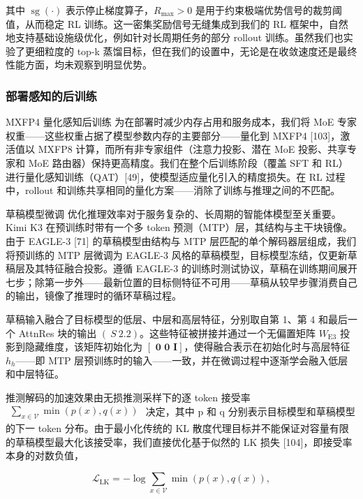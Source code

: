 \documentclass[
  10
]{article}
\begin{document}
其中 \(\operatorname { s g } ( \cdot )\) 表示停止梯度算子，\(R _ { \operatorname* { m a x } } > 0\) 是用于约束极端优势信号的裁剪阈值，从而稳定 RL 训练。这一密集奖励信号无缝集成到我们的 RL 框架中，自然地支持基础设施级优化，例如针对长周期任务的部分 rollout 训练。虽然我们也实验了更细粒度的 top-k 蒸馏目标，但在我们的设置中，无论是在收敛速度还是最终性能方面，均未观察到明显优势。

\subsubsection{部署感知的后训练}\label{deployment-aware-post-training}

MXFP4 量化感知后训练 为在部署时减少内存占用和服务成本，我们将 MoE 专家权重——这些权重占据了模型参数内存的主要部分——量化到 MXFP4 {[}103{]}，激活值以 MXFP8 计算，而所有非专家组件（注意力投影、潜在 MoE 投影、共享专家和 MoE 路由器）保持更高精度。我们在整个后训练阶段（覆盖 SFT 和 RL）进行量化感知训练（QAT）{[}49{]}，使模型适应量化引入的精度损失。在 RL 过程中，rollout 和训练共享相同的量化方案——消除了训练与推理之间的不匹配。

草稿模型微调 优化推理效率对于服务复杂的、长周期的智能体模型至关重要。Kimi K3 在预训练时带有一个多 token 预测（MTP）层，其结构与主干块镜像。由于 EAGLE-3 {[}71{]} 的草稿模型由结构与 MTP 层匹配的单个解码器层组成，我们将预训练的 MTP 层微调为 EAGLE-3 风格的草稿模型，目标模型冻结，仅更新草稿层及其特征融合投影。遵循 EAGLE-3 的训练时测试协议，草稿在训练期间展开七步；除第一步外——最新位置的目标侧特征不可用——草稿从较早步骤消费自己的输出，镜像了推理时的循环草稿过程。

草稿输入融合了目标模型的低层、中层和高层特征，分别取自第 1、第 4 和最后一个 AttnRes 块的输出 \(( \ S ~ 2 . 2 )\)。这些特征被拼接并通过一个无偏置矩阵 \(W _ { \mathrm { E 3 } }\) 投影到隐藏维度，该矩阵初始化为 \(\left[ \textbf { 0 0 } \pmb { I } \right]\)，使得融合表示在初始化时与高层特征 \(h _ { h }\)——即 MTP 层预训练时的输入——一致，并在微调过程中逐渐学会融入低层和中层特征。

推测解码的加速效果由无损推测采样下的逐 token 接受率 \(\begin{array} { r } { \sum _ { x \in \mathcal { V } } \operatorname* { m i n } ( p ( x ) , q ( x ) ) } \end{array}\) 决定，其中 p 和 q 分别表示目标模型和草稿模型的下一 token 分布。由于最小化传统的 KL 散度代理目标并不能保证对容量有限的草稿模型最大化该接受率，我们直接优化基于似然的 LK 损失 {[}104{]}，即接受率本身的对数负值，

\[
\mathcal {L} _ {\mathrm{LK}} = - \log \sum_ {x \in \mathcal {V}} \min (p (x), q (x)),\tag{16}
\]
\end{document}
